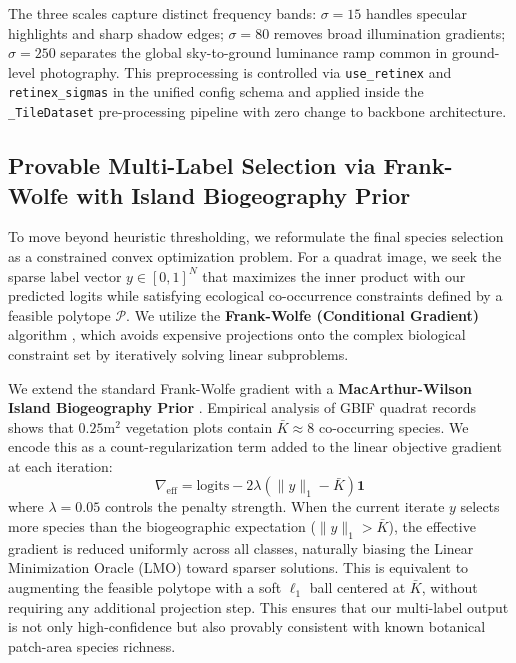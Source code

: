 \documentclass[10pt,twocolumn,letterpaper]{article}
\begin{document}
The three scales capture distinct frequency bands: $\sigma=15$ handles specular highlights and sharp shadow edges; $\sigma=80$ removes broad illumination gradients; $\sigma=250$ separates the global sky-to-ground luminance ramp common in ground-level photography. This preprocessing is controlled via \texttt{use\_retinex} and \texttt{retinex\_sigmas} in the unified config schema and applied inside the \texttt{\_TileDataset} pre-processing pipeline with zero change to backbone architecture.

\subsection{Provable Multi-Label Selection via Frank-Wolfe with Island Biogeography Prior}
To move beyond heuristic thresholding, we reformulate the final species selection as a constrained convex optimization problem. For a quadrat image, we seek the sparse label vector $y \in [0,1]^N$ that maximizes the inner product with our predicted logits while satisfying ecological co-occurrence constraints defined by a feasible polytope $\mathcal{P}$. We utilize the \textbf{Frank-Wolfe (Conditional Gradient)} algorithm \cite{consistent_fw}, which avoids expensive projections onto the complex biological constraint set by iteratively solving linear subproblems.

We extend the standard Frank-Wolfe gradient with a \textbf{MacArthur-Wilson Island Biogeography Prior} \cite{macarthur_wilson}. Empirical analysis of GBIF quadrat records shows that $0.25\text{m}^2$ vegetation plots contain $\bar{K} \approx 8$ co-occurring species. We encode this as a count-regularization term added to the linear objective gradient at each iteration:
\begin{equation}
    \nabla_{\text{eff}} = \text{logits} - 2\lambda\left(\|y\|_1 - \bar{K}\right)\mathbf{1}
\end{equation}
where $\lambda=0.05$ controls the penalty strength. When the current iterate $y$ selects more species than the biogeographic expectation ($\|y\|_1 > \bar{K}$), the effective gradient is reduced uniformly across all classes, naturally biasing the Linear Minimization Oracle (LMO) toward sparser solutions. This is equivalent to augmenting the feasible polytope with a soft $\ell_1$ ball centered at $\bar{K}$, without requiring any additional projection step. This ensures that our multi-label output is not only high-confidence but also provably consistent with known botanical patch-area species richness.
\end{document}
